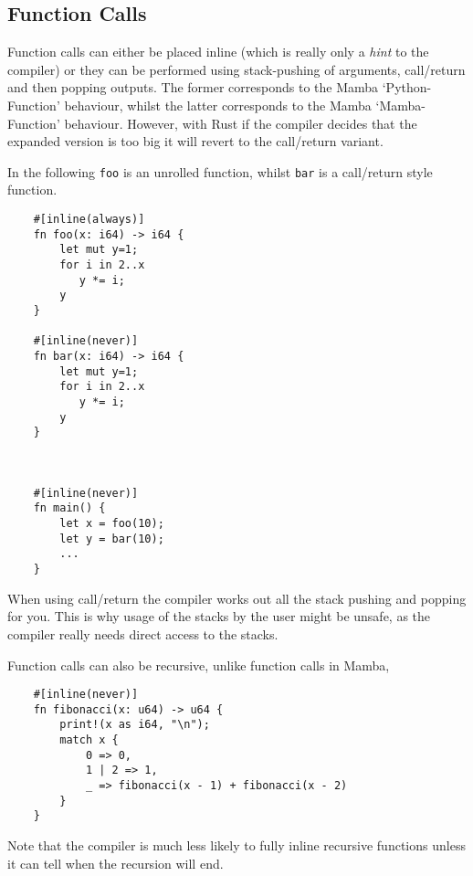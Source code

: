 \subsection{Function Calls}
Function calls can either be placed inline (which is really only a
    {\em hint} to the compiler) or they can be performed using
stack-pushing of arguments, call/return and then popping outputs.
The former corresponds to the Mamba `Python-Function' behaviour,
whilst the latter corresponds to the Mamba `Mamba-Function' behaviour.
However, with Rust if the compiler decides that the expanded version
is too big it will revert to the call/return variant.

In the following \verb|foo| is an unrolled function,
whilst \verb|bar| is a call/return style function.

\begin{lstlisting}
    #[inline(always)]
    fn foo(x: i64) -> i64 {
        let mut y=1;
        for i in 2..x
           y *= i;
        y
    }

    #[inline(never)]
    fn bar(x: i64) -> i64 {
        let mut y=1;
        for i in 2..x
           y *= i;
        y
    }



    #[inline(never)]
    fn main() {
        let x = foo(10);
        let y = bar(10);
        ...
    }
\end{lstlisting}
When using call/return the compiler works out all the stack pushing
and popping for you.
This is why usage of the stacks by the user might be unsafe, as the
compiler really needs direct access to the stacks.

Function calls can also be recursive, unlike function calls in Mamba,
\begin{lstlisting}
    #[inline(never)]
    fn fibonacci(x: u64) -> u64 {
        print!(x as i64, "\n");
        match x {
            0 => 0,
            1 | 2 => 1,
            _ => fibonacci(x - 1) + fibonacci(x - 2)
        }
    }
\end{lstlisting}
Note that the compiler is much less likely to fully inline recursive
functions unless it can tell when the recursion will end.
